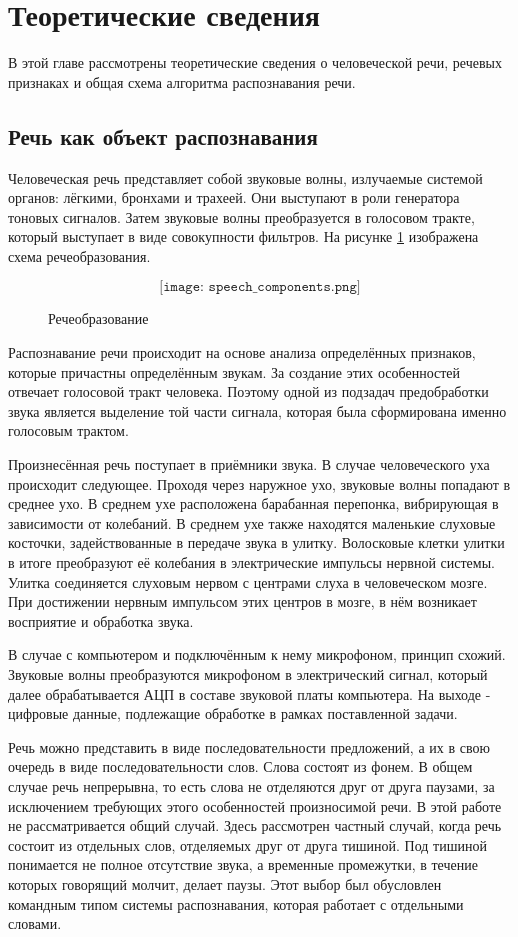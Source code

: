 \section{Теоретические сведения}
В этой главе рассмотрены теоретические сведения о человеческой речи, речевых признаках и общая схема алгоритма распознавания речи.

\subsection{Речь как объект распознавания}
Человеческая речь представляет собой звуковые волны, излучаемые системой органов: лёгкими, бронхами и трахеей. Они выступают в роли генератора тоновых сигналов. Затем звуковые волны преобразуется в голосовом тракте, который выступает в виде совокупности фильтров. На рисунке \ref{fig:speech_components} изображена схема речеобразования.

\begin{figure}[H]
	\[\texttt{[image: speech\_components.png]}\]
	\caption{Речеобразование}
	\label{fig:speech_components}
\end{figure}

Распознавание речи происходит на основе анализа определённых признаков, которые причастны определённым звукам. За создание этих особенностей отвечает голосовой тракт человека. Поэтому одной из подзадач предобработки звука является выделение той части сигнала, которая была сформирована именно голосовым трактом.

Произнесённая речь поступает в приёмники звука. В случае человеческого уха происходит следующее. Проходя через наружное ухо, звуковые волны попадают в среднее ухо. В среднем ухе расположена барабанная перепонка, вибрирующая в зависимости от колебаний. В среднем ухе также находятся маленькие слуховые косточки, задействованные в передаче звука в улитку. Волосковые клетки улитки в итоге преобразуют её колебания в электрические импульсы нервной системы. Улитка соединяется слуховым нервом с центрами слуха в человеческом мозге. При достижении нервным импульсом этих центров в мозге, в нём возникает восприятие и обработка звука. 

В случае с компьютером и подключённым к нему микрофоном, принцип схожий. Звуковые волны преобразуются микрофоном в электрический сигнал, который далее обрабатывается АЦП в составе звуковой платы компьютера. На выходе - цифровые данные, подлежащие обработке в рамках поставленной задачи.

Речь можно представить в виде последовательности предложений, а их в свою очередь в виде последовательности слов. Слова состоят из фонем. В общем случае речь непрерывна, то есть слова не отделяются друг от друга паузами, за исключением требующих этого особенностей произносимой речи. В этой работе не рассматривается общий случай. Здесь рассмотрен частный случай, когда речь состоит из отдельных слов, отделяемых друг от друга тишиной. Под тишиной понимается не полное отсутствие звука, а временные промежутки, в течение которых говорящий молчит, делает паузы. Этот выбор был обусловлен командным типом системы распознавания, которая работает с отдельными словами.


